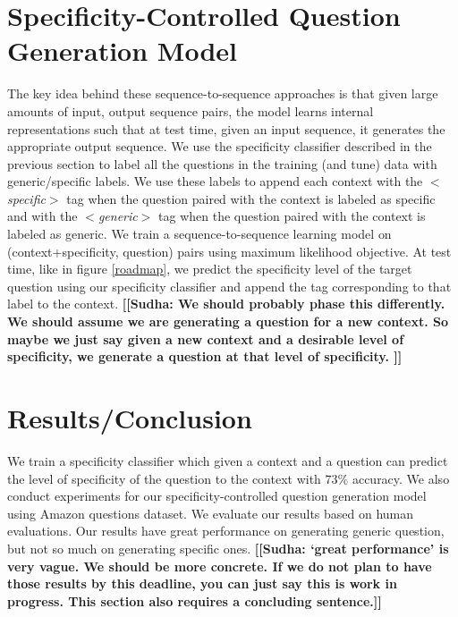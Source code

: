 \documentclass[11pt]{article}
\newcommand{\sudha}[1]{\textbf{\textsf{\textcolor{blue!80!white}{\footnotesize [[Sudha: #1]]}}}}
\begin{document}
\section{Specificity-Controlled Question Generation Model}\label{model}
The key idea behind these sequence-to-sequence approaches is that given large amounts of input, output sequence pairs, the model learns internal representations such that at test time, given an input sequence, it generates the appropriate output sequence. 
We use the specificity classifier described in the previous section to label all the questions in the training (and tune) data with generic/specific labels. 
We use these labels to append each context with the \textit{$<$specific$>$} tag when the question paired with the context is labeled as specific and with the \textit{$<$generic$>$} tag when the question paired with the context is labeled as generic.
We train a sequence-to-sequence learning model \cite{sutskever2014sequence} on (context+specificity, question) pairs using maximum likelihood objective. 
At test time, like in figure \ref{roadmap}, we predict the specificity level of the target question using our specificity classifier and append the tag corresponding to that label to the context. \sudha{We should probably phase this differently. We should assume we are generating a question for a new context. So maybe we just say given a new context and a desirable level of specificity, we generate a question at that level of specificity. }


\section{Results/Conclusion}
We train a specificity classifier which given a context and a question can predict the level of specificity of the question to the context with $73 \%$ accuracy. 
We also conduct experiments for our specificity-controlled question generation model using Amazon questions dataset. We evaluate our results based on human evaluations. Our results have great performance on generating generic question, but not so much on generating specific ones. \sudha{`great performance' is very vague. We should be more concrete. If we do not plan to have those results by this deadline, you can just say this is work in progress. This section also requires a concluding sentence.} 

%
%



\end{document}
